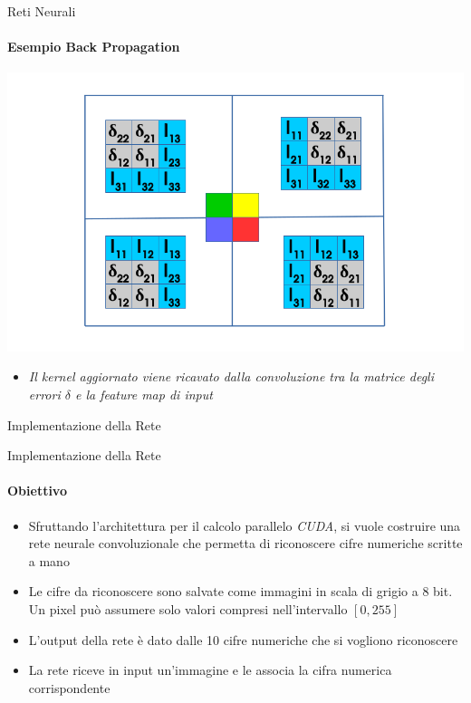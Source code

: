 \documentclass[
 ]{beamer}
\begin{document}
\begin{frame}{Reti Neurali}
    \framesubtitle{Esempio Back Propagation} 
    
    \begin{center}
      \includegraphics[scale = 0.4]{back_conv3.png}
    \end{center}
        
    \begin{itemize}
        \setlength\itemsep{1em}
        \item[] \large \emph{Il kernel aggiornato viene ricavato dalla convoluzione tra la matrice degli errori $\delta$ e la feature map di input}
    \end{itemize}
\end{frame} 


\begin{frame}[c]
  \centering
  \bigskip \bigskip    
  \Huge Implementazione della Rete
\end{frame}

\begin{frame}{Implementazione della Rete}
    \framesubtitle{Obiettivo}
    \begin{itemize} [<+->]
        \setlength\itemsep{2em}
        \item \large Sfruttando l'architettura per il calcolo parallelo \emph{CUDA}, si vuole costruire una rete neurale convoluzionale che permetta di riconoscere cifre numeriche scritte a mano
        \item \large Le cifre da riconoscere sono salvate come immagini in scala di grigio a 8 bit. Un pixel può assumere solo valori compresi nell'intervallo $[0,255]$
        \item \large L'output della rete è dato dalle 10 cifre numeriche che si vogliono riconoscere
        \item \large La rete riceve in input un'immagine e le associa la cifra numerica corrispondente
    \end{itemize}
\end{frame}
\end{document}
